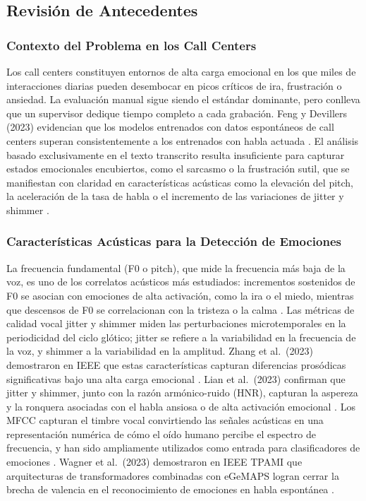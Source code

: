 \subsection{Revisión de Antecedentes}
\label{sec:rt_antecedentes}

\subsubsection{Contexto del Problema en los Call Centers}

Los call centers constituyen entornos de alta carga emocional en los que miles de
interacciones diarias pueden desembocar en picos críticos de ira, frustración o
ansiedad. La evaluación manual sigue siendo el estándar dominante, pero conlleva que
un supervisor dedique tiempo completo a cada grabación. Feng y Devillers (2023)
evidencian que los modelos entrenados con datos espontáneos de call centers superan
consistentemente a los entrenados con habla actuada \cite{feng2023}. El análisis
basado exclusivamente en el texto transcrito resulta insuficiente para capturar
estados emocionales encubiertos, como el sarcasmo o la frustración sutil, que se
manifiestan con claridad en características acústicas como la elevación del pitch, la
aceleración de la tasa de habla o el incremento de las variaciones de jitter y
shimmer \cite{jha2022, lian2023}.

\subsubsection{Características Acústicas para la Detección de Emociones}

La frecuencia fundamental (F0 o pitch), que mide la frecuencia más baja de la voz,
es uno de los correlatos acústicos más estudiados: incrementos sostenidos de F0 se
asocian con emociones de alta activación, como la ira o el miedo, mientras que
descensos de F0 se correlacionan con la tristeza o la calma \cite{jha2022, lian2023}.
Las métricas de calidad vocal jitter y shimmer miden las perturbaciones
microtemporales en la periodicidad del ciclo glótico; jitter se refiere a la
variabilidad en la frecuencia de la voz, y shimmer a la variabilidad en la amplitud.
Zhang et al.\ (2023) demostraron en IEEE que estas características capturan diferencias
prosódicas significativas bajo una alta carga emocional \cite{zhang2023}. Lian et al.\
(2023) confirman que jitter y shimmer, junto con la razón armónico-ruido (HNR),
capturan la aspereza y la ronquera asociadas con el habla ansiosa o de alta activación
emocional \cite{lian2023}. Los MFCC capturan el timbre vocal convirtiendo las señales
acústicas en una representación numérica de cómo el oído humano percibe el espectro
de frecuencia, y han sido ampliamente utilizados como entrada para clasificadores de
emociones \cite{jha2022, abdelhamid2022}. Wagner et al.\ (2023) demostraron en IEEE
TPAMI que arquitecturas de transformadores combinadas con eGeMAPS logran cerrar la
brecha de valencia en el reconocimiento de emociones en habla espontánea
\cite{wagner2023}.

